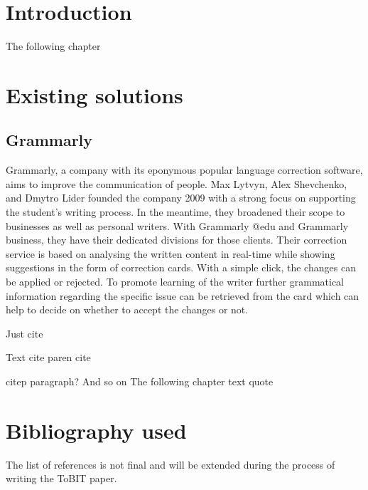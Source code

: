 \documentclass[runningheads]{llncs}
\begin{document}
\section{Introduction}\label{sec:outl}
The following chapter 

\newpage


\section{Existing solutions}
\subsection{Grammarly}
Grammarly, a company with its eponymous popular language correction software, aims to improve the communication of people. Max Lytvyn, Alex Shevchenko, and Dmytro Lider founded the company 2009 with a strong focus on supporting the student's writing process. In the meantime, they broadened their scope to businesses as well as personal writers. With Grammarly @edu and Grammarly business, they have their dedicated divisions for those clients. Their correction service is based on analysing the written content in real-time while showing suggestions in the form of correction cards.  With a simple click, the changes can be applied or rejected. To promote learning of the writer further grammatical information regarding the specific issue can be retrieved from the card which can help to decide on whether to accept the changes or not. \citep{grammarly_website}


Just cite \cite{dembsey_closing_2017}
\newline

Text cite \textcite{dembsey_closing_2017}
\newline
paren cite \parencite{dembsey_closing_2017}
\newline

citep paragraph? And so on \citep{dembsey_closing_2017}
The following chapter 
\newline
text quote 
\newline
\newpage
\section{Bibliography used}
The list of references is not final and will be extended during the process of writing the ToBIT paper.
\printbibliography
\end{document}
